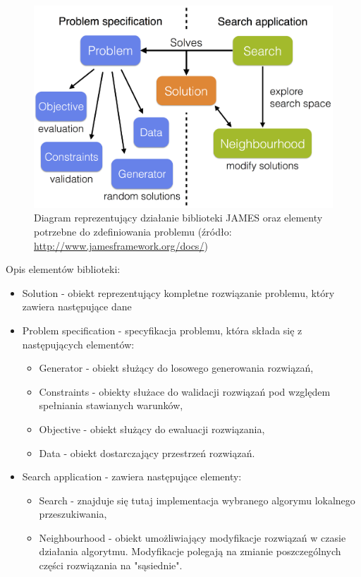 \begin{figure}[ht]{}
	\centering
	\includegraphics[scale=0.1]{images/diagram-detailed.png}
	\caption {
		 Diagram reprezentujący działanie biblioteki JAMES oraz elementy potrzebne do zdefiniowania problemu (źródło: \url{http://www.jamesframework.org/docs/})
	}
	\label{fig:james}
\end{figure}

Opis elementów biblioteki:
\begin{itemize}
    \item Solution - obiekt reprezentujący kompletne rozwiązanie problemu, który zawiera następujące dane
    \item Problem specification - specyfikacja problemu, która składa się z następujących elementów:
    \begin{itemize}
        \item Generator - obiekt służący do losowego generowania rozwiązań,
        \item Constraints - obiekty służace do walidacji rozwiązań pod względem spełniania stawianych warunków,
        \item Objective - obiekt służący do ewaluacji rozwiązania,
        \item Data - obiekt dostarczający przestrzeń rozwiązań.
    \end{itemize}
    \item Search application - zawiera następujące elementy:
    \begin{itemize}
        \item Search - znajduje się tutaj implementacja wybranego algorymu lokalnego przeszukiwania,
        \item Neighbourhood - obiekt umożliwiający modyfikacje rozwiązań w czasie działania algorytmu. Modyfikacje polegają na zmianie poszczególnych części rozwiązania na "sąsiednie".
    \end{itemize}
\end{itemize}

